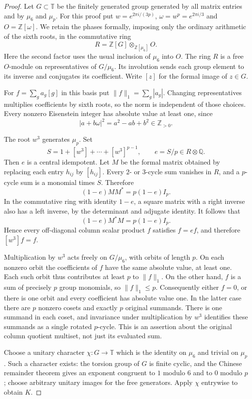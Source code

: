 \documentclass[11pt,a4paper]{article}
\theoremstyle{plain}
\theoremstyle{definition}
\theoremstyle{plain}
\begin{document}
\begin{proof}
Let $G\subset\mathbb{T}$ be the finitely generated group generated by all matrix entries and by $\mu_6$ and $\mu_p$. For this proof put $w=e^{2\pi i/(3p)}$, $\omega=w^p=e^{2\pi i/3}$ and $O=\mathbb Z[\omega]$. We retain the phases formally, imposing only the ordinary arithmetic of the sixth roots, in the commutative ring
$$R=\mathbb{Z}[G]\otimes_{\mathbb{Z}[\mu_6]}O.$$
Here the second factor uses the usual inclusion of $\mu_6$ into $O$. The ring $R$ is a free $O$-module on representatives of $G/\mu_6$. Its involution sends each group element to its inverse and conjugates its coefficient. Write $[z]$ for the formal image of $z\in G$.

For $f=\sum_g a_g[g]$ in this basis put $\|f\|_1=\sum_g|a_g|$. Changing representatives multiplies coefficients by sixth roots, so the norm is independent of those choices. Every nonzero Eisenstein integer has absolute value at least one, since
$$|a+b\omega|^2=a^2-ab+b^2\in\mathbb{Z}_{>0}.$$

The root $w^3$ generates $\mu_p$. Set
$$S=1+[w^3]+\cdots+[w^3]^{p-1},\qquad e=S/p\in R\otimes\mathbb{Q}.$$
Then $e$ is a central idempotent. Let $M$ be the formal matrix obtained by replacing each entry $h_{ij}$ by $[h_{ij}]$. Every $2$- or $3$-cycle sum vanishes in $R$, and a $p$-cycle sum is a monomial times $S$. Therefore
$$(1-e)MM^*=p(1-e)I_p.$$
In the commutative ring with identity $1-e$, a square matrix with a right inverse also has a left inverse, by the determinant and adjugate identity. It follows that
$$(1-e)M^*M=p(1-e)I_p.$$
Hence every off-diagonal column scalar product $f$ satisfies $f=ef$, and therefore $[w^3]f=f$.

Multiplication by $w^3$ acts freely on $G/\mu_6$, with orbits of length $p$. On each nonzero orbit the coefficients of $f$ have the same absolute value, at least one. Each such orbit thus contributes at least $p$ to $\|f\|_1$. On the other hand, $f$ is a sum of precisely $p$ group monomials, so $\|f\|_1\le p$. Consequently either $f=0$, or there is one orbit and every coefficient has absolute value one. In the latter case there are $p$ nonzero cosets and exactly $p$ original summands. There is one summand in each coset, and invariance under multiplication by $w^3$ identifies these summands as a single rotated $p$-cycle. This is an assertion about the original column quotient multiset, not just its evaluated sum.

Choose a unitary character $\chi:G\to\mathbb{T}$ which is the identity on $\mu_6$ and trivial on $\mu_p$. Such a character exists: the torsion group of $G$ is finite cyclic, and the Chinese remainder theorem gives an exponent congruent to $1$ modulo $6$ and to $0$ modulo $p$; choose arbitrary unitary images for the free generators. Apply $\chi$ entrywise to obtain $K$.


\end{proof}
\end{document}
